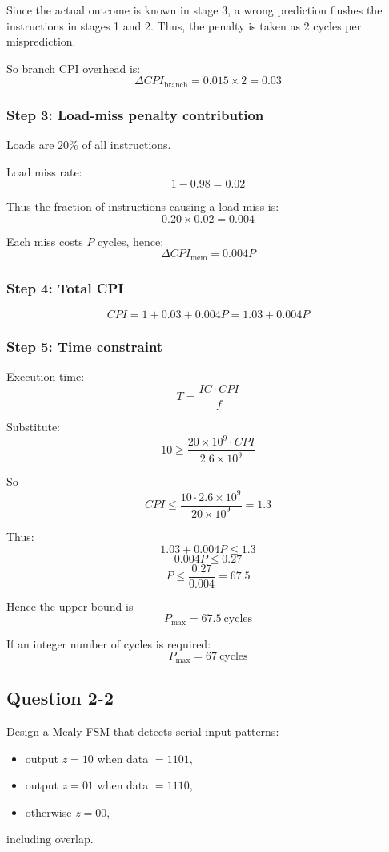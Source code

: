 \documentclass[12pt,a4paper]{article}
\begin{document}
Since the actual outcome is known in stage 3, a wrong prediction flushes the instructions in stages 1 and 2.  
Thus, the penalty is taken as \(2\) cycles per misprediction.

So branch CPI overhead is:
\[
\Delta CPI_{\text{branch}} = 0.015\times 2 = 0.03
\]

\subsubsection*{Step 3: Load-miss penalty contribution}

Loads are \(20\%\) of all instructions.

Load miss rate:
\[
1-0.98=0.02
\]

Thus the fraction of instructions causing a load miss is:
\[
0.20\times 0.02=0.004
\]

Each miss costs \(P\) cycles, hence:
\[
\Delta CPI_{\text{mem}} = 0.004P
\]

\subsubsection*{Step 4: Total CPI}

\[
CPI = 1 + 0.03 + 0.004P = 1.03 + 0.004P
\]

\subsubsection*{Step 5: Time constraint}

Execution time:
\[
T=\frac{IC\cdot CPI}{f}
\]

Substitute:
\[
10 \ge \frac{20\times 10^9 \cdot CPI}{2.6\times 10^9}
\]

So
\[
CPI \le \frac{10\cdot 2.6\times 10^9}{20\times 10^9}=1.3
\]

Thus:
\[
1.03 + 0.004P \le 1.3
\]
\[
0.004P \le 0.27
\]
\[
P \le \frac{0.27}{0.004}=67.5
\]

Hence the upper bound is
\[
\boxed{P_{\max}=67.5\ \text{cycles}}
\]

If an integer number of cycles is required:
\[
\boxed{P_{\max}=67\ \text{cycles}}
\]

\subsection*{Question 2-2}

Design a Mealy FSM that detects serial input patterns:
\begin{itemize}[leftmargin=2em]
    \item output \(z=10\) when data \(=1101\),
    \item output \(z=01\) when data \(=1110\),
    \item otherwise \(z=00\),
\end{itemize}
including overlap.
\end{document}
